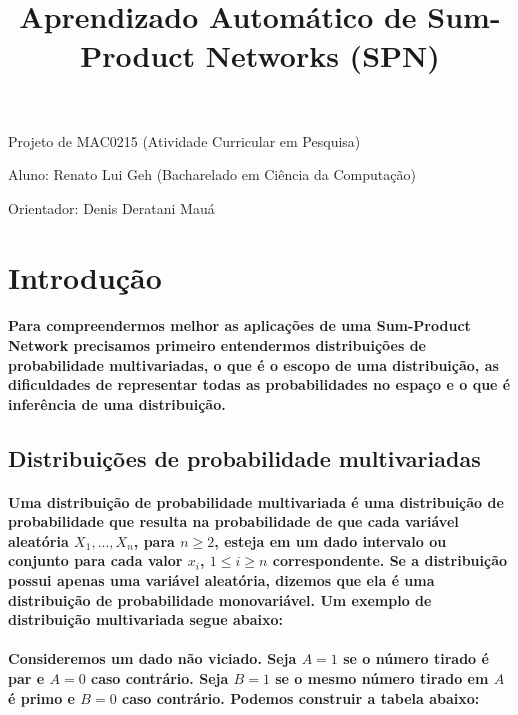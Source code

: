 \documentclass[a4paper,10pt]{article}
\title{\textbf{Aprendizado Automático de Sum-Product Networks (SPN)}}
\theoremstyle{plain}
\begin{document}
\date{}
\author{}
\vspace*{-40pt}
{\let\newpage\relax\maketitle}

Projeto de MAC0215 (Atividade Curricular em Pesquisa)

Aluno: Renato Lui Geh (Bacharelado em Ciência da Computação)

Orientador: Denis Deratani Mauá

\section{Introdução}

\paragraph{
  Para compreendermos melhor as aplicações de uma Sum-Product Network precisamos primeiro entendermos distribuições
de probabilidade multivariadas, o que é o escopo de uma distribuição, as dificuldades de representar todas as 
probabilidades no espaço e o que é inferência de uma distribuição.
}

\subsection{Distribuições de probabilidade multivariadas}

\paragraph{
  Uma distribuição de probabilidade multivariada é uma distribuição de probabilidade que resulta na probabilidade 
de que cada variável aleatória $X_1,...,X_n$, para $n\geq{2}$, esteja em um dado intervalo ou conjunto para cada valor 
$x_i$, $1\leq{i}\geq{n}$ correspondente. Se a distribuição possui apenas uma variável aleatória, dizemos que ela é uma
distribuição de probabilidade monovariável. Um exemplo de distribuição multivariada segue abaixo:
}

\paragraph{
  Consideremos um dado não viciado. Seja $A=1$ se o número tirado é par e $A=0$ caso contrário. Seja $B=1$ se o
mesmo número tirado em $A$ é primo e $B=0$ caso contrário. Podemos construir a tabela abaixo:
}
\end{document}
